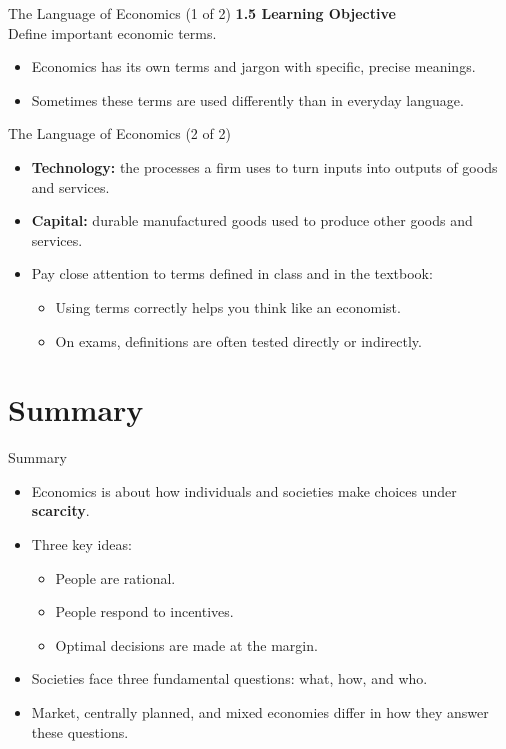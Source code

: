 \documentclass[aspectratio=169]{beamer}
\begin{document}
\begin{frame}{The Language of Economics (1 of 2)}
\transfade
\textbf{1.5 Learning Objective}\\[0.3em]
Define important economic terms.
\begin{itemize}
  \item Economics has its own terms and jargon with specific, precise meanings.
  \item Sometimes these terms are used differently than in everyday language.
\end{itemize}
\end{frame}

\begin{frame}{The Language of Economics (2 of 2)}
\transfade
\begin{itemize}
  \item \textbf{Technology:} the processes a firm uses to turn inputs into outputs of goods and services.
  \item \textbf{Capital:} durable manufactured goods used to produce other goods and services.
  \item Pay close attention to terms defined in class and in the textbook:
  \begin{itemize}
    \item Using terms correctly helps you think like an economist.
    \item On exams, definitions are often tested directly or indirectly.
  \end{itemize}
\end{itemize}
\end{frame}

\section{Summary}

\begin{frame}{Summary}
\transfade
\begin{itemize}
  \item Economics is about how individuals and societies make choices under \textbf{scarcity}.
  \item Three key ideas:
  \begin{itemize}
    \item People are rational.
    \item People respond to incentives.
    \item Optimal decisions are made at the margin.
  \end{itemize}
  \item Societies face three fundamental questions: what, how, and who.
  \item Market, centrally planned, and mixed economies differ in how they answer these questions.
\end{itemize}
\end{frame}
\end{document}
